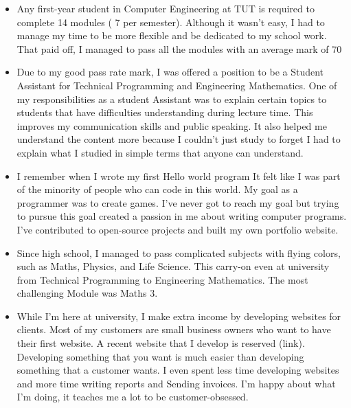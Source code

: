 \documentclass[11pt,a4paper,roman]{moderncv}        %
\begin{document}
\begin{itemize} \itemsep1em 
	\item Any first-year student in Computer Engineering at TUT is required to complete 14 modules ( 7 per semester). Although it wasn't easy, I had to manage my time to be more flexible and be dedicated to my school work. That paid off, I managed to pass all the modules with an average mark of 70%
  
	\item Due to my good pass rate mark, I was offered a position to be a Student Assistant for Technical Programming and Engineering Mathematics. One of my responsibilities as a student Assistant was to explain certain topics to students that have difficulties understanding during lecture time. This improves my communication skills and public speaking. It also helped me understand the content more because I couldn't just study to forget I had to explain what I studied in simple terms that anyone can understand.

	\item I remember when I wrote my first Hello world program It felt like I was part of the minority of people who can code in this world. My goal as a programmer was to create games. I've never got to reach my goal but trying to pursue this goal created a passion in me about writing computer programs. I've contributed to open-source projects and built my own portfolio website.

	\item Since high school, I managed to pass complicated subjects with flying colors, such as Maths, Physics, and Life Science. This carry-on even at university from Technical Programming to Engineering Mathematics. The most challenging Module was Maths 3.

	\item While I'm here at university, I make extra income by developing websites for clients. Most of my customers are small business owners who want to have their first website. A recent website that I   develop is reserved (link). Developing something that you want is much easier than developing something that a customer wants. I even spent less time developing websites and more time writing reports and Sending invoices. I'm happy about what I'm doing, it teaches me a lot to be customer-obsessed.

\end{itemize}



\vspace{0.5cm}


\makeletterclosing
\end{document}
